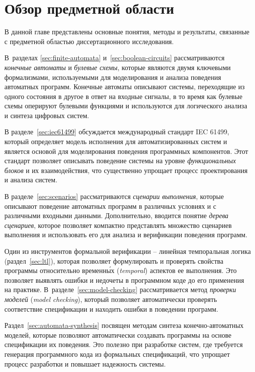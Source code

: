 \chapter{Обзор предметной области}
\label{ch:overview}

В данной главе представлены основные понятия, методы и результаты, связанные с предметной областью диссертационного исследования.

В~разделах \ref{sec:finite-automata} и~\ref{sec:boolean-circuits} рассматриваются \textit{конечные автоматы} и \textit{булевые схемы}, которые являются двумя ключевыми формализмами, используемыми для моделирования и анализа поведения автоматных программ.
Конечные автоматы описывают системы, переходящие из одного состояния в другое в ответ на входные сигналы, в то время как булевые схемы оперируют булевыми функциями и используются для логического анализа и синтеза цифровых систем.

В разделе~\ref{sec:iec61499} обсуждается международный стандарт IEC 61499, который определяет модель исполнения для автоматизированных систем и является основой для моделирования поведения программных компонентов.
Этот стандарт позволяет описывать поведение системы на уровне \textit{функциональных блоков} и их взаимодействия, что существенно упрощает процесс проектирования и анализа систем.

В разделе~\ref{sec:scenarios} рассматриваются \textit{сценарии выполнения}, которые описывают поведение автоматных программ в различных условиях и с различными входными данными.
Дополнительно, вводится понятие \textit{дерева сценариев}, которое позволяет компактно представлять множество сценариев выполнения и использовать его для анализа и верификации поведения программ.

Один из инструментов формальной верификации \--- линейная темпоральная логика (раздел~\ref{sec:ltl}), которая позволяет формулировать и проверять свойства программы относительно временн\'{ы}х (\textit{temporal}) аспектов ее выполнения.
Это позволяет выявлять ошибки и недочеты в программном коде до его применения на практике.
В~разделе~\ref{sec:model-checking} рассматривается метод \textit{проверки моделей} (\textit{model checking}), который позволяет автоматически проверять соответствие спецификации и находить ошибки в поведении программ.

Раздел~\ref{sec:automata-synthesis} посвящен методам синтеза конечно-автоматных моделей, которые позволяют автоматически создавать программы на основе спецификации их поведения.
Это полезно при разработке систем, где требуется генерация программного кода из формальных спецификаций, что упрощает процесс разработки и повышает надежность системы.

